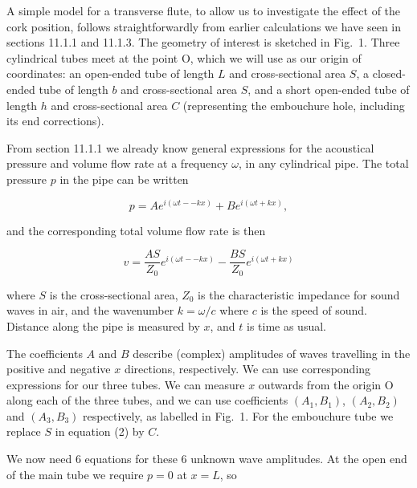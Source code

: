   A simple model for a transverse flute, to allow us to investigate the effect 
  of the cork position, follows straightforwardly from earlier calculations we 
  have seen in sections 11.1.1 and 11.1.3. The geometry of interest is sketched 
  in Fig.\ 1. Three cylindrical tubes meet at the point O, which we will use as 
  our origin of coordinates: an open-ended tube of length $L$ and 
  cross-sectional area $S$, a closed-ended tube of length $b$ and 
  cross-sectional area $S$, and a short open-ended tube of length $h$ and 
  cross-sectional area $C$ (representing the embouchure hole, including its end 
  corrections). 


  From section 11.1.1 we already know general expressions for the acoustical 
  pressure and volume flow rate at a frequency $\omega$, in any cylindrical 
  pipe. The total pressure $p$ in the pipe can be written 

  \begin{equation*}p=Ae^{i(\omega t -- kx)}+Be^{i(\omega t + kx)} , 
  \tag{1}\end{equation*} 

  \noindent{}and the corresponding total volume flow rate is then 

  \begin{equation*}v=\dfrac{AS}{Z_0}e^{i(\omega t -- 
  kx)}-\dfrac{BS}{Z_0}e^{i(\omega t + kx)} \tag{2}\end{equation*} 

  \noindent{}where $S$ is the cross-sectional area, $Z_0$ is the characteristic 
  impedance for sound waves in air, and the wavenumber $k=\omega/c$ where $c$ 
  is the speed of sound. Distance along the pipe is measured by $x$, and $t$ is 
  time as usual. 

  The coefficients $A$ and $B$ describe (complex) amplitudes of waves 
  travelling in the positive and negative $x$ directions, respectively. We can 
  use corresponding expressions for our three tubes. We can measure $x$ 
  outwards from the origin O along each of the three tubes, and we can use 
  coefficients $(A_1,B_1)$, $(A_2,B_2)$ and $(A_3,B_3)$ respectively, as 
  labelled in Fig.\ 1. For the embouchure tube we replace $S$ in equation (2) 
  by $C$. 

  We now need 6 equations for these 6 unknown wave amplitudes. At the open end 
  of the main tube we require $p=0$ at $x=L$, so 

